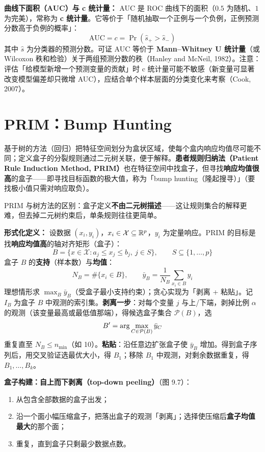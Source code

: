\textbf{曲线下面积（AUC）与 c 统计量：} AUC 是 ROC 曲线下的面积（$0.5$ 为随机、$1$ 为完美），常称为 \textbf{c 统计量}。它等价于「随机抽取一个正例与一个负例，正例预测分数高于负例的概率」：
\[
    \mathrm{AUC} = c = \Pr(\hat s_+ > \hat s_-)
\]
其中 $\hat s$ 为分类器的预测分数。可证 AUC 等价于 \textbf{Mann--Whitney U 统计量}（或 Wilcoxon 秩和检验）关于两组预测分数的秩（Hanley and McNeil, 1982）。注意：评估「给模型新增一个预测变量的贡献」时 c 统计量可能不敏感（新变量可显著改变模型偏差却只微增 AUC），应结合单个样本层面的分类变化来考察（Cook, 2007）。

\section{PRIM：Bump Hunting}

基于树的方法（回归）把特征空间划分为盒状区域，使每个盒内响应均值尽可能不同；定义盒子的分裂规则通过二元树关联，便于解释。\textbf{患者规则归纳法（Patient Rule Induction Method, PRIM）}也在特征空间中找盒子，但寻找\textbf{响应均值很高}的盒子——即寻找目标函数的极大值，称为「bump hunting（隆起搜寻）」（要找极小值只需对响应取负）。

PRIM 与树方法的区别：盒子定义\textbf{不由二元树描述}——这让规则集合的解释更难，但去掉二元树约束后，单条规则往往更简单。

\textbf{形式化定义：} 设数据 $(x_i, y_i)$，$x_i \in \mathcal{X} \subseteq \mathbb{R}^p$，$y_i$ 为定量响应。PRIM 的目标是找\textbf{响应均值高}的轴对齐矩形（盒子）：
\[
    B = \{x \in \mathcal{X} : a_j \le x_j \le b_j,\ j \in S\},\qquad S \subseteq \{1, \ldots, p\}
\]
盒子 $B$ 的\textbf{支持}（样本数）与\textbf{均值}：
\[
    N_B = \#\{x_i \in B\}, \qquad \bar y_B = \frac{1}{N_B}\sum_{x_i \in B} y_i
\]
理想情形求 $\max_B \bar y_B$（受盒子最小支持约束）；贪心实现为「剥离 + 粘贴」。记 $I_B$ 为盒子 $B$ 中观测的索引集。\textbf{剥离一步}：对每个变量 $j$ 与上/下端，剥掉比例 $\alpha$ 的观测（该变量最高或最低值那端），得候选盒子集合 $\mathcal{P}(B)$，选
\[
    B' = \arg\max_{C \in \mathcal{P}(B)} \bar y_C
\]
重复直至 $N_B \le n_{\min}$（如 10）。\textbf{粘贴}：沿任意边扩张盒子使 $\bar y_B$ 增加。得到盒子序列后，用交叉验证选最优大小，得 $B_1$；移除 $B_1$ 中观测，对剩余数据重复，得 $B_1, \ldots, B_k$。

\textbf{盒子构建：自上而下剥离（top-down peeling）}（图 9.7）：
\begin{enumerate}
    \item 从包含全部数据的盒子出发；
    \item 沿一个面小幅压缩盒子，把落出盒子的观测「剥离」；选择使压缩后\textbf{盒子均值最大}的那个面；
    \item 重复，直到盒子只剩最少数据点数。
\end{enumerate}

